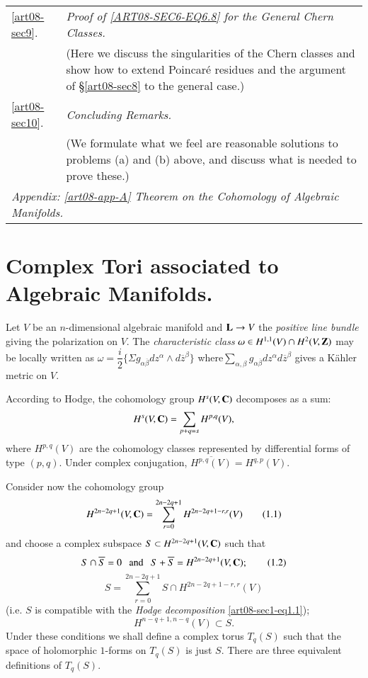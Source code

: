\begin{longtable}{lp{9cm}}
\ref{art08-sec9}. & {\em Proof of \eqref{ART08-SEC6-EQ6.8} for the General Chern Classes.}\\
                  & (Here we discuss the singularities of the Chern classes and show how to extend Poincar\'e residues and the argument of \S\ref{art08-sec8} to the general case.)\\[5pt]
\ref{art08-sec10}. & {\em Concluding Remarks.}\\
                   & (We formulate what we feel are reasonable solutions to problems (a) and (b) above, and discuss what is needed to prove these.)\\[5pt]
\multicolumn{2}{l}{\em Appendix: \ref{art08-app-A} Theorem on the Cohomology of Algebraic Manifolds.}\\[4pt]
\hline
\end{longtable}\pageoriginale



\section{Complex Tori associated to Algebraic Manifolds.}\label{art08-sec1}

Let $V$ be an $n$-dimensional algebraic manifold and $\mathbf{L}\to V$ the {\em positive line bundle} giving the polarization on $V$. The {\em characteristic class} $\omega \in H^{1,1}(V)\cap H^{2}(V,\mathbf{Z})$ may be locally written as $\omega=\dfrac{i}{2}\{\Sigma g_{\alpha\overline{\beta}}dz^{\alpha}\wedge d\overline{z}^{\beta}\}$ where\pageoriginale $\sum\limits_{\alpha,\beta}g_{\alpha\overline{\beta}}dz^{\alpha}d\overline{z}^{\beta}$ gives a K\"ahler metric on $V$.

According to Hodge, the cohomology group $H^{s}(V,\mathbf{C})$ decomposes as a sum:
$$
H^{s}(V,\mathbf{C})=\sum\limits_{p+q=s}H^{p,q}(V),
$$
where $H^{p,q}(V)$ are the cohomology classes represented by differential forms of type $(p,q)$. Under complex conjugation, $\overline{H^{p,q}(V)}=H^{q,p}(V)$. 

Consider now the cohomology group
\begin{equation*}
H^{2n-2q+1}(V,\mathbf{C})=\sum\limits^{2n-2q+1}_{r=0}H^{2n-2q+1-r,r}(V)\tag{1.1}\label{art08-sec1-eq1.1}
\end{equation*}
and choose a complex subspace $S\subset H^{2n-2q+1}(V,\mathbf{C})$ such that
\begin{equation*}
S\cap \overline{S}=0\text{~~ and ~~} S+\overline{S}=H^{2n-2q+1}(V,\mathbf{C});\tag{1.2}\label{art08-sec1-eq1.2}
\end{equation*}
\begin{equation*}
S=\sum\limits^{2n-2q+1}_{r=0}S\cap H^{2n-2q+1-r,r}(V)\tag{1.3}\label{art08-sec1-eq1.3}
\end{equation*}
(i.e. $S$ is compatible with the {\em Hodge decomposition} \eqref{art08-sec1-eq1.1});
\begin{equation*}
H^{n-q+1,n-q}(V)\subset S.\tag{1.4}\label{art08-sec1-eq1.4}
\end{equation*}
Under these conditions we shall define a complex torus $T_{q}(S)$ such that the space of holomorphic $1$-forms on $T_{q}(S)$ is just $S$. There are three equivalent definitions of $T_{q}(S)$.

